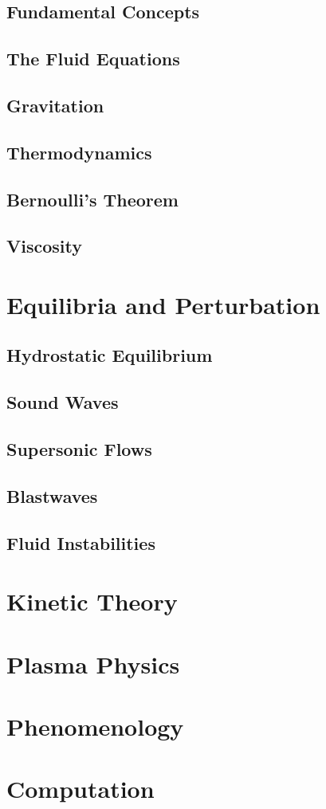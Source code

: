 \documentclass[11pt,fleqn]{book} %
\begin{document}
\chapter{Fundamental Concepts}
\label{ch:1}

\chapter{The Fluid Equations}

\chapter{Gravitation}

\chapter{Thermodynamics}

\chapter{Bernoulli's Theorem}

\chapter{Viscosity}


\part{Equilibria and Perturbation}

\chapter{Hydrostatic Equilibrium}

\chapter{Sound Waves}

\chapter{Supersonic Flows}

\chapter{Blastwaves}

\chapter{Fluid Instabilities}


\part{Kinetic Theory}

\part{Plasma Physics}

\part{Phenomenology}

\part{Computation}



\end{document}
